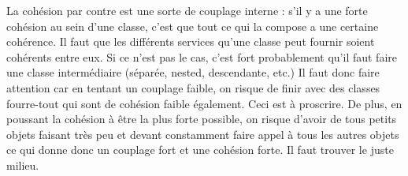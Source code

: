 \documentclass{article}
\begin{document}
		La cohésion par contre est une sorte de couplage interne : s'il y a une forte cohésion au sein d'une classe, c'est que tout ce qui la compose a une certaine cohérence. Il faut que les
		différents services qu'une classe peut fournir soient cohérents entre eux. Si ce n'est pas le cas, c'est fort probablement qu'il faut faire une classe intermédiaire (séparée, nested,
		descendante, etc.)  Il faut donc faire attention car en tentant un couplage faible, on risque de finir avec des classes fourre-tout qui sont de cohésion faible également. Ceci est à
		proscrire. De plus, en poussant la cohésion à être la plus forte possible, on risque d'avoir de tous petits objets faisant très peu et devant constamment faire appel à tous les autres objets
		ce qui donne donc un couplage fort et une cohésion forte. Il faut trouver le juste milieu.
\end{document}
